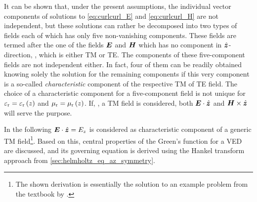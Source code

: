 It can be shown that, under the present assumptions, the individual vector
components of solutions to \eqref{eq:curlcurl_E} and \eqref{eq:curlcurl_H} are
not independent, but these solutions can rather be decomposed into two types
of fields each of which has only five non-vanishing components.
These fields are termed after the one of the fields $\pvec{E}$ and $\pvec{H}$
which has no component in $\uv{z}$-direction, \ie, which is either \acf{TM} or
\acf{TE}.
The components of these five-component fields are not independent either.
In fact, four of them can be readily obtained knowing solely the solution for
the remaining components if this very component is a so-called
\emph{characteristic} component of the respective \ac{TM} of \ac{TE} field.
The choice of a characteristic component for a five-component field is not
unique for $\varepsilon_{\mathrm{r}} = \varepsilon_{\mathrm{r}}\left(z\right)$ and $\mu_{\mathrm{r}} = \mu_{\mathrm{r}}\left(z\right)$.
If, \eg, a \ac{TM} field is considered, both $\pvec{E} \cdot \uv{z}$ and
$\pvec{H} \times \uv{z}$ will serve the purpose.

In the following $\pvec{E} \cdot \uv{z} = E_z$ is considered as characteristic
component of a generic \ac{TM} field\footnote{The shown derivation is
essentially the solution to an example problem from the textbook by
\textcite[140]{Chew1999}.}.
Based on this, central properties of the Green's function for a \ac{VED} are
discussed, and its governing equation is derived using the Hankel transform
approach from \cref{sec:helmholtz_eq_az_symmetry}.

